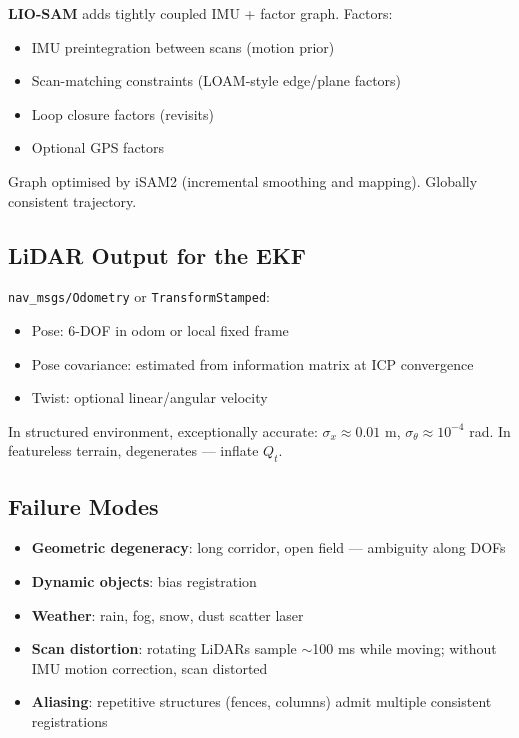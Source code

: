 \documentclass[11pt,a4paper]{article}
\begin{document}
\textbf{LIO-SAM} adds tightly coupled IMU + factor graph. Factors:
\begin{itemize}
\item IMU preintegration between scans (motion prior)
\item Scan-matching constraints (LOAM-style edge/plane factors)
\item Loop closure factors (revisits)
\item Optional GPS factors
\end{itemize}
Graph optimised by iSAM2 (incremental smoothing and mapping). Globally consistent trajectory.

\subsection{LiDAR Output for the EKF}

\texttt{nav\_msgs/Odometry} or \texttt{TransformStamped}:
\begin{itemize}
\item Pose: 6-DOF in odom or local fixed frame
\item Pose covariance: estimated from information matrix at ICP convergence
\item Twist: optional linear/angular velocity
\end{itemize}

In structured environment, exceptionally accurate: $\sigma_x \approx 0.01$ m, $\sigma_\theta \approx 10^{-4}$ rad. In featureless terrain, degenerates --- inflate $Q_t$.

\subsection{Failure Modes}

\begin{itemize}
\item \textbf{Geometric degeneracy}: long corridor, open field --- ambiguity along DOFs
\item \textbf{Dynamic objects}: bias registration
\item \textbf{Weather}: rain, fog, snow, dust scatter laser
\item \textbf{Scan distortion}: rotating LiDARs sample $\sim$100 ms while moving; without IMU motion correction, scan distorted
\item \textbf{Aliasing}: repetitive structures (fences, columns) admit multiple consistent registrations
\end{itemize}
\end{document}
